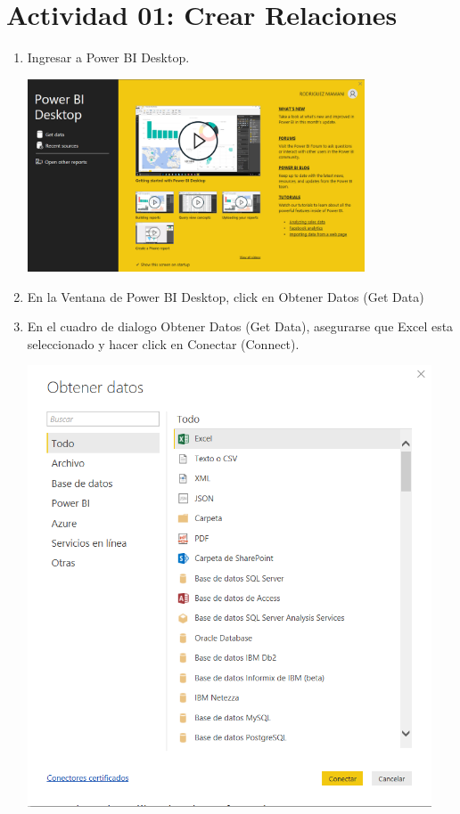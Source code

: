 \section{Actividad 01: Crear Relaciones } 


\begin{enumerate}[1.]
    \item Ingresar a Power BI Desktop.

	\begin{center}
	\includegraphics[width=10cm]{./Imagenes/imagen1}
	\end{center}	

    \item En la Ventana de Power BI Desktop, click en Obtener Datos (Get Data)

    \item En el cuadro de dialogo Obtener Datos (Get Data), asegurarse que Excel esta seleccionado y hacer click
en Conectar (Connect).

	\begin{center}
	\includegraphics[width=12cm]{./Imagenes/power1}
	\end{center}	


\end{enumerate}
